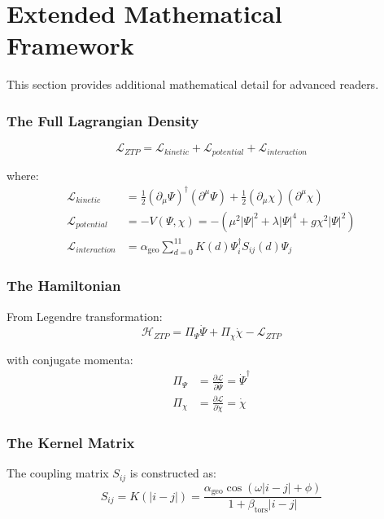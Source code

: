 \documentclass[11pt, a4paper]{article}
\theoremstyle{remark}
\newcommand{\Lagr}{\mathcal{L}}
\newcommand{\Ham}{\mathcal{H}}
\newcommand{\alphageo}{\alpha_{\text{geo}}}
\newcommand{\betators}{\beta_{\text{tors}}}
\begin{document}
\part{Extended Mathematical Framework}

This section provides additional mathematical detail for advanced readers.

\section{The Full Lagrangian Density}

\begin{equation}
\Lagr_{ZTP} = \Lagr_{kinetic} + \Lagr_{potential} + \Lagr_{interaction}
\end{equation}

where:
\begin{align}
\Lagr_{kinetic} &= \frac{1}{2}(\partial_\mu \Psi)^\dagger (\partial^\mu \Psi) + \frac{1}{2}(\partial_\mu \chi)(\partial^\mu \chi) \\
\Lagr_{potential} &= -V(\Psi, \chi) = -\left(\mu^2 |\Psi|^2 + \lambda |\Psi|^4 + g\chi^2|\Psi|^2\right) \\
\Lagr_{interaction} &= \alphageo \sum_{d=0}^{11} K(d) \Psi^\dagger_i S_{ij}(d) \Psi_j
\end{align}

\section{The Hamiltonian}

From Legendre transformation:
\begin{equation}
\Ham_{ZTP} = \Pi_\Psi \dot{\Psi} + \Pi_\chi \dot{\chi} - \Lagr_{ZTP}
\end{equation}

with conjugate momenta:
\begin{align}
\Pi_\Psi &= \frac{\partial \Lagr}{\partial \dot{\Psi}} = \dot{\Psi}^\dagger \\
\Pi_\chi &= \frac{\partial \Lagr}{\partial \dot{\chi}} = \dot{\chi}
\end{align}

\section{The Kernel Matrix}

The coupling matrix $S_{ij}$ is constructed as:
\begin{equation}
S_{ij} = K(|i - j|) = \frac{\alphageo \cos(\omega |i-j| + \phi)}{1 + \betators |i-j|}
\end{equation}
\end{document}
